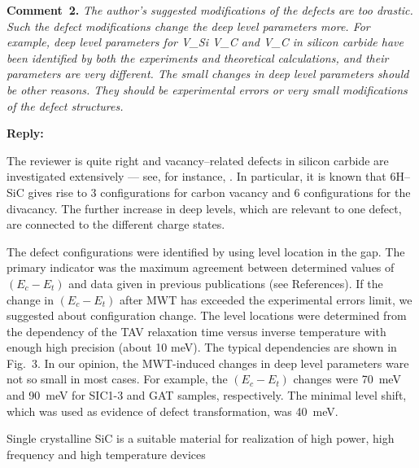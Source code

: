 \documentclass[10pt]{iopart}
\begin{document}
\vspace{1cm}
\noindent
\textcolor[rgb]{0.00,0.50,1.00}{\textbf{Comment~2.}}
\emph{The author's suggested modifications of the defects are too drastic.
Such the defect modifications change the deep level parameters more.
For example, deep level parameters for V\_Si V\_C and V\_C in silicon carbide have been
identified by both the experiments and theoretical calculations,
and their parameters are very different.
The small changes in deep level parameters should be other reasons.
They should be experimental errors or very small modifications of the defect structures.}

\noindent
\textcolor[rgb]{0.51,0.00,0.00}{\textbf{Reply:}}

The reviewer is quite right and vacancy--related defects in silicon carbide are investigated extensively ---
see, for instance, \cite{6HSiC:Vsi,4HSiC:Vc,6HSiC:VV2019,4HSiC:Vacan,SiC:defEPR,6HSiC:VPAS,4HSiC:VV,SiC:bookCh6,
6HSiC:Vsi2021,6HSiC:vac2021,4HSiC:NV,SiC:NV}.
In particular, it is known \cite{6HSiC:VV2019} that
6H--SiC gives rise to 3 configurations for carbon vacancy
and 6 configurations for the divacancy.
The further increase in deep levels, which are relevant to one defect, are connected to the different charge states.

The defect configurations were identified by using level location in the gap.
The primary indicator was the maximum agreement between determined values of $(E_c-E_t)$ and data given in 
previous publications (see References).
If the change in $(E_c-E_t)$ after MWT has exceeded the experimental errors limit,
we suggested about configuration change.
The level locations were determined from the dependency of the TAV relaxation time 
versus inverse temperature with enough high precision  (about 10 meV).
The typical dependencies are shown in Fig.~3.
In our opinion, the MWT-induced changes in deep level parameters ware not so small in most cases.
For example, the $(E_c-E_t)$ changes were 70~meV and 90~meV for SIC1-3 and GAT samples, respectively.
The minimal level shift, which was used as evidence of defect transformation, was 40~meV.






\cite{LightNeuIrrad:1,LightNeuIrrad:2,SiC:bookCh17}



Single crystalline SiC is a suitable material for realization of high power, high frequency and high
temperature devices
\end{document}
